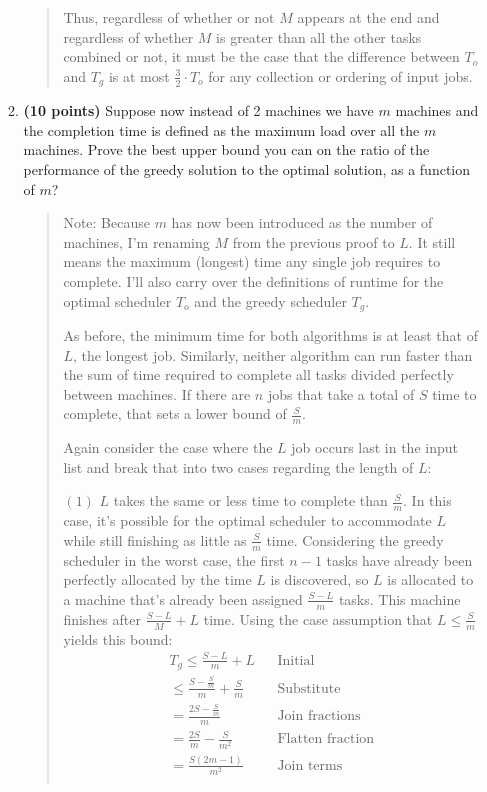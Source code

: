 \documentclass[11pt]{article}
\begin{document}
\begin{enumerate}
\begin{enumerate}
\begin{quote}
\begin{itemize}
\end{itemize}
Thus, regardless of whether or not $M$ appears at the end and regardless of whether $M$ is greater than all the other tasks combined or not, it must be the case that the difference between $T_o$ and $T_g$ is at most $\frac{3}{2} \cdot T_o$ for any collection or ordering of input jobs. 
\end{quote}
\item
{\bf (10 points)} 
Suppose now instead of 2 machines we have $m$ machines and the completion time is defined as the maximum load over all the $m$ machines.  
Prove the best upper bound you can on the ratio of the 
performance of the greedy solution to the optimal solution, as a
function of $m$? 
\begin{quote}
  \color{purple}
Note: Because $m$ has now been introduced as the number of machines, I'm renaming $M$ from the previous proof to $L$. It still means the maximum (longest) time any single job requires to complete. I'll also carry over the definitions of runtime for the optimal scheduler $T_o$ and the greedy scheduler $T_g$. 

\medskip
As before, the minimum time for both algorithms is at least that of $L$, the longest job. Similarly, neither algorithm can run faster than the sum of time required to complete all tasks divided perfectly between machines. If there are $n$ jobs that take a total of $S$ time to complete, that sets a lower bound of $\frac{S}{m}$. 

\medskip
Again consider the case where the $L$ job occurs last in the input list and break that into two cases regarding the length of $L$:

\medskip
$(1)$ $L$ takes the same or less time to complete than $\frac{S}{m}$. In this case, it's possible for the optimal scheduler to accommodate $L$ while still finishing as little as $\frac{S}{m}$ time. Considering the greedy scheduler in the worst case, the first $n - 1$ tasks have already been perfectly allocated by the time $L$ is discovered, so $L$ is allocated to a machine that's already been assigned $\frac{S - L}{m}$ tasks. This machine finishes after $\frac{S - L}{M} + L$ time. Using the case assumption that $L \leq \frac{S}{m}$ yields this bound:
  \begin{align*}
      && T_g \leq \frac{S - L}{m} + L && \text{Initial} && \\
      && \leq \frac{S - \frac{S}{m}}{m} + \frac{S}{m} && \text{Substitute} && \\
      && = \frac{2S - \frac{S}{m}}{m} && \text{Join fractions} && \\
      && = \frac{2S}{m} - \frac{S}{m^2} && \text{Flatten fraction} && \\
      && = \frac{S(2m - 1)}{m^2}  && \text{Join terms} && \\
  \end{align*} 


\end{quote}
\end{enumerate}
\end{enumerate}
\end{document}
